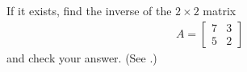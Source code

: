 If it exists, find the inverse of the $2\times 2$ matrix
%
\begin{align*}
A=\begin{bmatrix}
7&3\\5&2
\end{bmatrix}
\end{align*}
%
and check your answer.  (See .)
